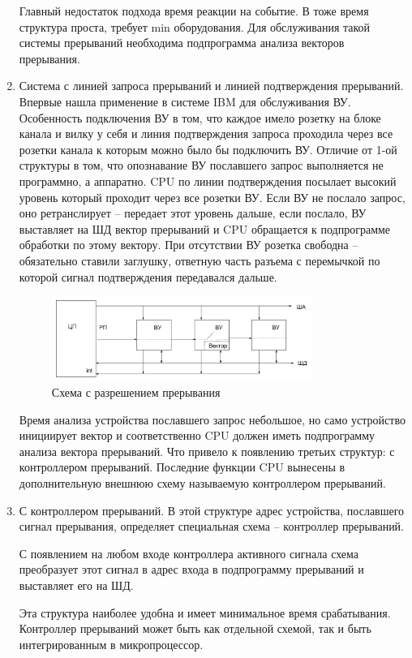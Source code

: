 \documentclass[unicode, 12pt, a4paper, oneside]{article}
\begin{document}
\begin{enumerate}
 Главный недостаток подхода время реакции на событие. В тоже время структура проста, требует min оборудования. Для обслуживания такой системы прерываний необходима подпрограмма анализа векторов прерывания. 
\item	Система с линией запроса прерываний и линией подтверждения прерываний. Впервые нашла применение в системе IBM для обслуживания ВУ. Особенность подключения ВУ в том, что каждое имело розетку на блоке канала и вилку у себя и линия подтверждения запроса проходила через все розетки канала к которым можно было бы подключить ВУ. Отличие от 1-ой структуры в том, что опознавание ВУ пославшего запрос выполняется не программно, а аппаратно. CPU по линии подтверждения посылает высокий уровень который проходит через все розетки ВУ. Если ВУ не послало запрос, оно ретранслирует – передает этот уровень дальше, если послало, ВУ выставляет на ШД вектор прерываний и CPU обращается к подпрограмме обработки по этому вектору. При отсутствии ВУ розетка свободна – обязательно ставили заглушку, ответную часть разъема с перемычкой по которой сигнал подтверждения передавался дальше.
\begin{figure}[H]
\centering
\includegraphics[width=0.8\textwidth]{112_SRP.JPG}
\caption{Схема с разрешением прерывания}
\end{figure}

 Время анализа устройства пославшего запрос небольшое, но само устройство инициирует вектор и соответственно CPU должен иметь подпрограмму анализа вектора прерываний. Что привело к появлению третьих структур: с контроллером прерываний. Последние функции CPU вынесены в дополнительную внешнюю схему называемую контроллером прерываний.
\item	С контроллером прерываний.
В этой структуре адрес устройства, пославшего сигнал прерывания, определяет специальная схема -- контроллер прерываний.

С появлением на любом входе контроллера активного сигнала схема преобразует этот сигнал в адрес входа в подпрограмму прерываний и выставляет его на ШД.

Эта структура наиболее удобна и имеет минимальное время срабатывания. Контроллер прерываний может быть как отдельной схемой, так и быть интегрированным в микропроцессор.


\end{enumerate}
\end{document}
